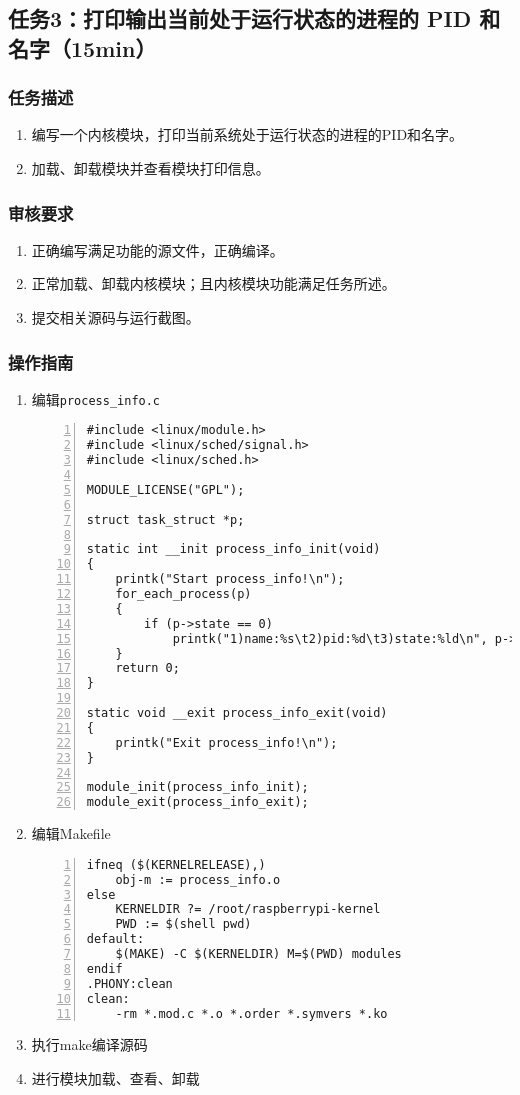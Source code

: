 \documentclass{article}
\begin{document}
\newpage

\subsection{任务3：打印输出当前处于运行状态的进程的 PID 和名字（15min）}

\subsubsection{任务描述}
\begin{enumerate}
    \item 编写一个内核模块，打印当前系统处于运行状态的进程的PID和名字。
    \item 加载、卸载模块并查看模块打印信息。
\end{enumerate}

\subsubsection{审核要求}
\begin{enumerate}
    \item 正确编写满足功能的源文件，正确编译。
    \item 正常加载、卸载内核模块；且内核模块功能满足任务所述。
    \item 提交相关源码与运行截图。
\end{enumerate}

\subsubsection{操作指南}
\begin{enumerate}
    \item 编辑\verb|process_info.c|
\begin{lstlisting}[numbers=left]
#include <linux/module.h>
#include <linux/sched/signal.h>
#include <linux/sched.h>

MODULE_LICENSE("GPL");

struct task_struct *p;

static int __init process_info_init(void)
{
	printk("Start process_info!\n");
	for_each_process(p)
	{
		if (p->state == 0)
			printk("1)name:%s\t2)pid:%d\t3)state:%ld\n", p->comm, p->pid, p->state);
	}
	return 0;
}

static void __exit process_info_exit(void)
{
	printk("Exit process_info!\n");
}

module_init(process_info_init);
module_exit(process_info_exit);

\end{lstlisting}
    \item 编辑Makefile
\begin{lstlisting}[numbers=left]
ifneq ($(KERNELRELEASE),)
	obj-m := process_info.o
else
	KERNELDIR ?= /root/raspberrypi-kernel
	PWD := $(shell pwd)
default:
	$(MAKE) -C $(KERNELDIR) M=$(PWD) modules
endif
.PHONY:clean
clean:
	-rm *.mod.c *.o *.order *.symvers *.ko

\end{lstlisting}
    \item 执行make编译源码
    \item 进行模块加载、查看、卸载
\end{enumerate}
\end{document}
